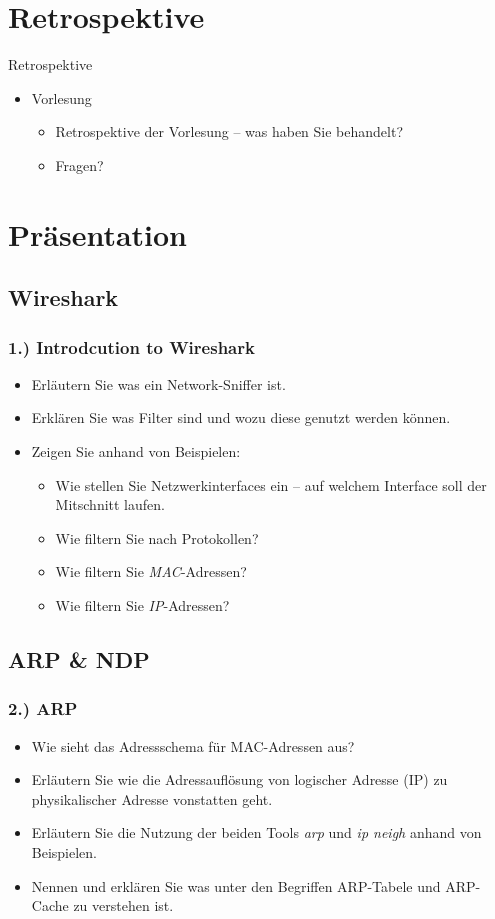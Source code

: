 \documentclass[xcolor=dvipsnames, aspectratio=169]{beamer}
\begin{document}
\section{Retrospektive}
\begin{frame}{Retrospektive}
\begin{itemize}
	\item Vorlesung
	\begin{itemize}
		\item Retrospektive der Vorlesung -- was haben Sie behandelt?
		\item Fragen?
	\end{itemize}
\end{itemize}
\end{frame}



\section{Präsentation}
\subsection{Wireshark}
\begin{frame}
\frametitle{1.) Introdcution to Wireshark}
	\begin{itemize}
		\item Erläutern Sie was ein Network-Sniffer ist.
		\item Erklären Sie was Filter sind und wozu diese genutzt werden können.
		\item Zeigen Sie anhand von Beispielen:
		\begin{itemize}
			\item Wie stellen Sie Netzwerkinterfaces ein -- auf welchem Interface soll der Mitschnitt laufen.
			\item Wie filtern Sie nach Protokollen?
			\item Wie filtern Sie \emph{MAC}-Adressen?
			\item Wie filtern Sie \emph{IP}-Adressen?
		\end{itemize}
	\end{itemize}
\end{frame}

\subsection{ARP \& NDP}
\begin{frame}
	\frametitle{2.) ARP}
	\begin{itemize}
		\item Wie sieht das Adressschema für MAC-Adressen aus?
		\item Erläutern Sie wie die Adressauflösung von logischer Adresse (IP) zu physikalischer Adresse vonstatten geht.
		\item Erläutern Sie die Nutzung der beiden Tools \emph{arp} und \emph{ip neigh} anhand von Beispielen.
		\item Nennen und erklären Sie was unter den Begriffen ARP-Tabele und ARP-Cache zu verstehen ist.
	\end{itemize}
\end{frame}
\end{document}
